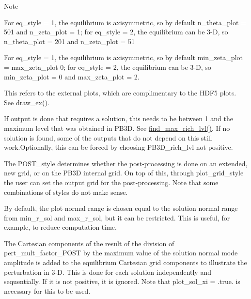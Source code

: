 \begin{DoxyNote}{Note}
\begin{DoxyEnumerate}
\item \label{page_inputs_fni19}%
%
For {\ttfamily eq\+\_\+style = 1}, the equilibrium is axisymmetric, so by default {\ttfamily n\+\_\+theta\+\_\+plot = 501} and {\ttfamily n\+\_\+zeta\+\_\+plot = 1}; for {\ttfamily eq\+\_\+style = 2}, the equilibrium can be 3-\/D, so {\ttfamily n\+\_\+theta\+\_\+plot = 201} and {\ttfamily n\+\_\+zeta\+\_\+plot = 51}
\item \label{page_inputs_fni20}%
%
For {\ttfamily eq\+\_\+style = 1}, the equilibrium is axisymmetric, so by default {\ttfamily min\+\_\+zeta\+\_\+plot = max\+\_\+zeta\+\_\+plot 0}; for {\ttfamily eq\+\_\+style = 2}, the equilibrium can be 3-\/D, so {\ttfamily min\+\_\+zeta\+\_\+plot = 0} and {\ttfamily max\+\_\+zeta\+\_\+plot = 2}.
\item \label{page_inputs_fni21}%
%
This refers to the external plots, which are complimentary to the H\+D\+F5 plots. See draw\+\_\+ex().
\item \label{page_inputs_fni22}%
%
If output is done that requires a solution, this needs to be between 1 and the maximum level that was obtained in P\+B3D. See \hyperlink{namespacerich__ops_acadb2170408937a71a230e655bd15675}{find\+\_\+max\+\_\+rich\+\_\+lvl()}. If no solution is found, some of the outputs that do not depend on this still work.\+Optionally, this can be forced by choosing {\ttfamily P\+B3\+D\+\_\+rich\+\_\+lvl} not positive.
\item \label{page_inputs_fni23}%
%
The {\ttfamily P\+O\+S\+T\+\_\+style} determines whether the post-\/processing is done on an extended, new grid, or on the P\+B3D internal grid. On top of this, through {\ttfamily plot\+\_\+grid\+\_\+style} the user can set the output grid for the post-\/processing. Note that some combinations of styles do not make sense.
\item \label{page_inputs_fni24}%
%
By default, the plot normal range is chosen equal to the solution normal range from {\ttfamily min\+\_\+r\+\_\+sol} and {\ttfamily max\+\_\+r\+\_\+sol}, but it can be restricted. This is useful, for example, to reduce computation time.
\item \label{page_inputs_fni25}%
%
The Cartesian components of the result of the division of {\ttfamily pert\+\_\+mult\+\_\+factor\+\_\+\+P\+O\+ST} by the maximum value of the solution normal mode amplitude is added to the equilibrium Cartesian grid components to illustrate the perturbation in 3-\/D. This is done for each solution independently and sequentially. If it is not positive, it is ignored. Note that {\ttfamily plot\+\_\+sol\+\_\+xi = .true.} is necessary for this to be used.

\end{DoxyEnumerate}
\end{DoxyNote}

